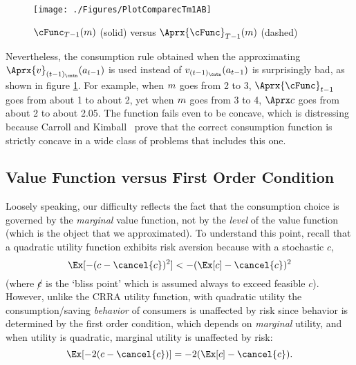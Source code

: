 \documentclass[SolvingMicroDSOPs]{subfiles}
\begin{document}
\hypertarget{PlotComparecTm1AB}{}
\begin{figure}
  \centerline{\texttt{[image: ./Figures/PlotComparecTm1AB]}}
  \caption{$\cFunc_{\trmT-1}(\mNrm)$ (solid) versus $\Aprx{\cFunc}_{\trmT-1}(\mNrm)$ (dashed)}
  \label{fig:PlotComparecTm1AB}
\end{figure}


Nevertheless, the consumption rule obtained when the approximating $\Aprx{\vFunc}_{(\prdT-1)_\cntn}(a_{\prdT-1})$ is used instead of $\vFunc_{(\prdT-1)_\cntn}(a_{\prdT-1})$ is surprisingly bad, as shown in figure \ref{fig:PlotComparecTm1AB}.  For example, when $m$ goes from 2 to 3, $\Aprx{\cFunc}_{\prdT-1}$ goes from about 1 to about 2, yet when $m$ goes from 3 to 4, $\Aprx\cNrm$ goes from about 2 to about 2.05.  The function fails even to be concave, which is distressing because Carroll and Kimball~\citeyearpar{ckConcavity} prove that the correct consumption function is strictly concave in a wide class of problems that includes this one.

\hypertarget{value-function-versus-first-order-condition}{}
\subsection{Value Function versus First Order Condition}\label{subsec:vVsuP}

Loosely speaking, our difficulty reflects the fact that the
consumption choice is governed by the \textit{marginal} value function,
not by the \textit{level} of the value function (which is the object that
we approximated).  To understand this point, recall that a quadratic
utility function
exhibits risk aversion because with a stochastic $c$,
\begin{equation}
  \Ex[-(c - \cancel{c})^{2}] < - (\Ex[c] - \cancel{c})^{2}
\end{equation}
(where $\cancel{c}$ is the `bliss point' which is assumed always to exceed feasible $c$). However, unlike the CRRA utility function,
with quadratic utility the consumption/saving \textit{behavior} of consumers
is unaffected by risk since behavior is determined by the first order condition, which
depends on \textit{marginal} utility, and when utility is quadratic, marginal utility is unaffected
by risk:
\begin{equation}
  \Ex[-2(c - \cancel{c})] = - 2(\Ex[c] - \cancel{c}).
\end{equation}
\end{document}
